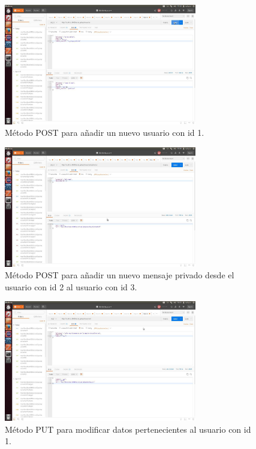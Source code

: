 \documentclass[12pt,a4paper, spanish]{article}
\begin{document}
\begin{figure}[H]
	\centering
	\includegraphics[width=0.75\textwidth]{images/captura10.jpg}
	\caption{Método POST para añadir un nuevo usuario con id 1.}
\end{figure}

\begin{figure}[H]
	\centering
	\includegraphics[width=0.75\textwidth]{images/captura11.jpg}
	\caption{Método POST para añadir un nuevo mensaje privado desde el usuario con id 2 al usuario con id 3.}
\end{figure}

\begin{figure}[H]
	\centering
	\includegraphics[width=0.75\textwidth]{images/captura12.jpg}
	\caption{Método PUT para modificar datos pertenecientes al usuario con id 1.}
\end{figure}
\end{document}
